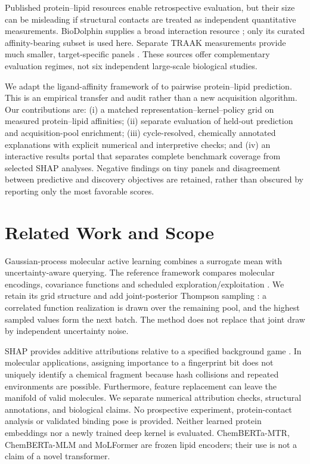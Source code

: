 \documentclass[wcp]{jmlr}
\begin{document}
Published protein--lipid resources enable retrospective evaluation, but their
size can be misleading if structural contacts are treated as independent
quantitative measurements. BioDolphin supplies a broad interaction resource
\citep{yang2024}; only its curated affinity-bearing subset is used here.
Separate TRAAK measurements provide much smaller, target-specific panels
\citep{schrecke2021}. These sources offer complementary evaluation regimes,
not six independent large-scale biological studies.

We adapt the ligand-affinity framework of \citet{srivastava2026} to pairwise
protein--lipid prediction. This is an empirical transfer and audit rather
than a new acquisition algorithm. Our contributions are: (i) a matched
representation--kernel--policy grid on measured protein--lipid affinities;
(ii) separate evaluation of held-out prediction and acquisition-pool
enrichment; (iii) cycle-resolved, chemically annotated explanations with
explicit numerical and interpretive checks; and (iv) an interactive results
portal that separates complete benchmark coverage from selected SHAP analyses.
Negative findings on tiny panels
and disagreement between predictive and discovery objectives are retained,
rather than obscured by reporting only the most favorable scores.

\section{Related Work and Scope}
Gaussian-process molecular active learning combines a surrogate mean with
uncertainty-aware querying. The reference framework compares molecular
encodings, covariance functions and scheduled exploration/exploitation
\citep{srivastava2026}. We retain its grid structure and add joint-posterior
Thompson sampling \citep{russo2018}: a correlated function realization is drawn over the
remaining pool, and the highest sampled values form the next batch. The
method does not replace that joint draw by independent uncertainty noise.

SHAP provides additive attributions relative to a specified background game
\citep{lundberg2017}. In molecular applications, assigning importance to a
fingerprint bit does not uniquely identify a chemical fragment because
hash collisions and repeated environments are possible. Furthermore,
feature replacement can leave the manifold of valid molecules. We separate
numerical attribution checks, structural annotations, and biological claims.
No prospective experiment, protein-contact analysis or validated binding
pose is provided. Neither learned protein embeddings nor a newly trained
deep kernel is evaluated. ChemBERTa-MTR, ChemBERTa-MLM and MoLFormer
are frozen lipid encoders; their use is not a claim of a novel transformer.
\end{document}
